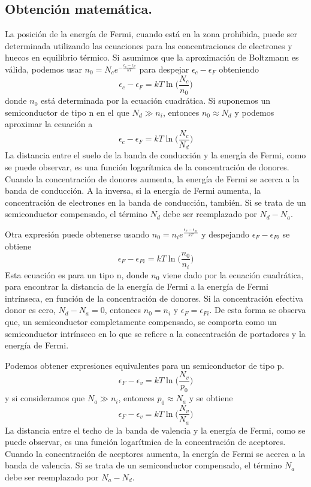 \documentclass[12pt,a4paper]{article}
\begin{document}
\subsection{Obtención matemática.}

La posición de la energía de Fermi, cuando está en la zona prohibida, puede ser determinada utilizando las ecuaciones para las concentraciones de electrones y huecos en equilibrio térmico. Si asumimos que la aproximación de Boltzmann es válida, podemos usar $n_{0} = N_{c} e^{-\frac{\epsilon _{c} - \epsilon _{F}}{kT}}$ para despejar $\epsilon _{c} - \epsilon _{F}$ obteniendo
\[ \epsilon _{c} - \epsilon _{F} = kT \ln \bigg( \frac{N_{c}}{n_{0}} \bigg) \]
donde $n_{0}$ está determinada por la ecuación cuadrática. Si suponemos un semiconductor de tipo n en el que $N_{d} \gg n_{i}$, entonces $n_{0} \approx N_{d}$ y podemos aproximar la ecuación a
\[ \epsilon _{c} - \epsilon _{F} = kT \ln \bigg( \frac{N_{c}}{N_{d}} \bigg) \]
La distancia entre el suelo de la banda de conducción y la energía de Fermi, como se puede observar, es una función logarítmica de la concentración de donores. Cuando la concentración de donores aumenta, la energía de Fermi se acerca a la banda de conducción. A la inversa, si la energía de Fermi aumenta, la concentración de electrones en la banda de conducción, también. Si se trata de un semiconductor compensado, el término $N_{d}$ debe ser reemplazado por $N_{d} - N_{a}$.

Otra expresión puede obtenerse usando $n_{0} = n_{i} e^{\frac{\epsilon _{F} - \epsilon _{Fi}}{kT}}$ y despejando $\epsilon _{F} - \epsilon _{Fi}$ se obtiene
\[ \epsilon _{F} - \epsilon _{Fi} = kT \ln \bigg( \frac{n_{0}}{n_{i}} \bigg) \]
Esta ecuación es para un tipo n, donde $n_{0}$ viene dado por la ecuación cuadrática, para encontrar la distancia de la energía de Fermi a la energía de Fermi intrínseca, en función de la concentración de donores. Si la concentración efectiva donor es cero, $N_{d} - N_{a}=0$, entonces $n_{0}=n_{i}$ y $\epsilon _{F} = \epsilon _{Fi}$. De esta forma se observa que, un semiconductor completamente compensado, se comporta como un semiconductor intrínseco en lo que se refiere a la concentración de portadores y la energía de Fermi.

Podemos obtener expresiones equivalentes para un semiconductor de tipo p.
\[ \epsilon _{F} - \epsilon _{v} = kT \ln \bigg( \frac{N_{v}}{p_{0}} \bigg) \]
y si consideramos que $N_{a} \gg n_{i}$, entonces $p_{0} \approx N_{a}$ y se obtiene
\[ \epsilon _{F} - \epsilon _{v} = kT \ln \bigg( \frac{N_{v}}{N_{a}} \bigg) \]
La distancia entre el techo de la banda de valencia y la energía de Fermi, como se puede observar, es una función logarítmica de la concentración de aceptores. Cuando la concentración de aceptores aumenta, la energía de Fermi se acerca a la banda de valencia. Si se trata de un semiconductor compensado, el término $N_{a}$ debe ser reemplazado por $N_{a} - N_{d}$.
\end{document}
